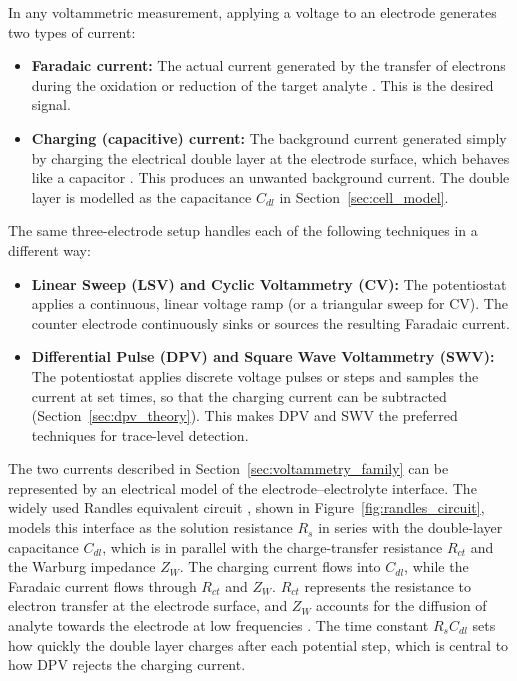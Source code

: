\label{sec:voltammetry_family}

In any voltammetric measurement, applying a voltage to an electrode generates two types of current:

\begin{itemize}[label=\textbullet]
    \item \textbf{Faradaic current:} The actual current generated by the transfer of electrons during the oxidation or reduction of the target analyte \cite{alyamni2024}. This is the desired signal.
    \item \textbf{Charging (capacitive) current:} The background current generated simply by charging the electrical double layer at the electrode surface, which behaves like a capacitor \cite{alyamni2024}. This produces an unwanted background current. The double layer is modelled as the capacitance $C_{dl}$ in Section~\ref{sec:cell_model}.
\end{itemize}

The same three-electrode setup handles each of the following techniques in a different way:

\begin{itemize}[label=\textbullet]
    \item \textbf{Linear Sweep (\ac{LSV}) and Cyclic Voltammetry (\ac{CV}):} The potentiostat applies a continuous, linear voltage ramp (or a triangular sweep for CV). The counter electrode continuously sinks or sources the resulting Faradaic current.
    \item \textbf{Differential Pulse (\ac{DPV}) and Square Wave Voltammetry (\ac{SWV}):} The potentiostat applies discrete voltage pulses or steps and samples the current at set times, so that the charging current can be subtracted (Section~\ref{sec:dpv_theory}). This makes DPV and SWV the preferred techniques for trace-level detection.
\end{itemize}

\label{sec:cell_model}

The two currents described in Section~\ref{sec:voltammetry_family} can be represented by an electrical model of the electrode--electrolyte interface. The widely used Randles equivalent circuit \cite{c5}, shown in Figure~\ref{fig:randles_circuit}, models this interface as the solution resistance $R_s$ in series with the double-layer capacitance $C_{dl}$, which is in parallel with the charge-transfer resistance $R_{ct}$ and the Warburg impedance $Z_W$. The charging current flows into $C_{dl}$, while the Faradaic current flows through $R_{ct}$ and $Z_W$. $R_{ct}$ represents the resistance to electron transfer at the electrode surface, and $Z_W$ accounts for the diffusion of analyte towards the electrode at low frequencies \cite{bard2001, Lisdat2008}. The time constant $R_sC_{dl}$ sets how quickly the double layer charges after each potential step, which is central to how \ac{DPV} rejects the charging current.

